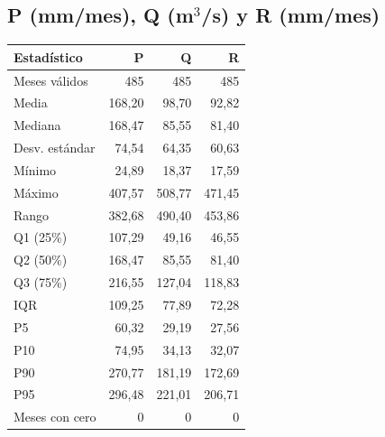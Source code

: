 \subsection*{P (mm/mes), Q (m$^3$/s) y R (mm/mes)}
\begin{center}\small\begin{tabular}{lrrr}\hline
Estadístico & P & Q & R \\ \hline
Meses válidos & 485 & 485 & 485 \\
Media & 168,20 & 98,70 & 92,82 \\
Mediana & 168,47 & 85,55 & 81,40 \\
Desv. estándar & 74,54 & 64,35 & 60,63 \\
Mínimo & 24,89 & 18,37 & 17,59 \\
Máximo & 407,57 & 508,77 & 471,45 \\
Rango & 382,68 & 490,40 & 453,86 \\
Q1 (25\%) & 107,29 & 49,16 & 46,55 \\
Q2 (50\%) & 168,47 & 85,55 & 81,40 \\
Q3 (75\%) & 216,55 & 127,04 & 118,83 \\
IQR & 109,25 & 77,89 & 72,28 \\
P5 & 60,32 & 29,19 & 27,56 \\
P10 & 74,95 & 34,13 & 32,07 \\
P90 & 270,77 & 181,19 & 172,69 \\
P95 & 296,48 & 221,01 & 206,71 \\
Meses con cero & 0 & 0 & 0 \\
\hline\end{tabular}\end{center}
